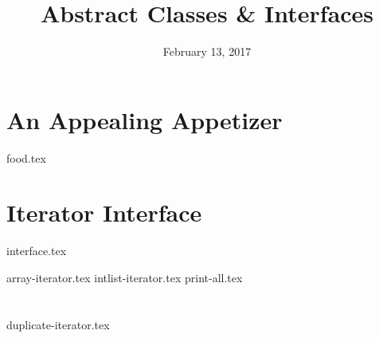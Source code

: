 \documentclass{exam}
\title{Abstract Classes \& Interfaces}
\date{February 13, 2017}
\begin{document}
\maketitle

\section{An Appealing Appetizer}
\begin{questions}
{food.tex}
\end{questions}

\clearpage

\section{Iterator Interface}
{interface.tex}
\begin{questions}
{array-iterator.tex}
\clearpage
{intlist-iterator.tex}
{print-all.tex}
\end{questions}

\clearpage

\section{}
\begin{questions}
{duplicate-iterator.tex}
\end{questions}
\end{document}
